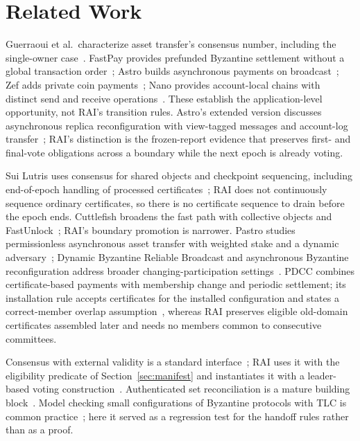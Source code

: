 \section{Related Work}
\label{sec:related}
Guerraoui et al.\ characterize asset transfer's consensus number, including the single-owner case~\cite{consensusnumber}. FastPay provides prefunded Byzantine settlement without a global transaction order~\cite{fastpay}; Astro builds asynchronous payments on broadcast~\cite{astro}; Zef adds private coin payments~\cite{zef}; Nano provides account-local chains with distinct send and receive operations~\cite{nano}. These establish the application-level opportunity, not RAI's transition rules. Astro's extended version discusses asynchronous replica reconfiguration with view-tagged messages and account-log transfer~\cite{astro,dbrb}; RAI's distinction is the frozen-report evidence that preserves first- and final-vote obligations across a boundary while the next epoch is already voting.

Sui Lutris uses consensus for shared objects and checkpoint sequencing, including end-of-epoch handling of processed certificates~\cite{lutris}; RAI does not continuously sequence ordinary certificates, so there is no certificate sequence to drain before the epoch ends. Cuttlefish broadens the fast path with collective objects and FastUnlock~\cite{cuttlefish}; RAI's boundary promotion is narrower. Pastro studies permissionless asynchronous asset transfer with weighted stake and a dynamic adversary~\cite{pastro}; Dynamic Byzantine Reliable Broadcast and asynchronous Byzantine reconfiguration address broader changing-participation settings~\cite{dbrb,reconfiguration}. PDCC combines certificate-based payments with membership change and periodic settlement; its installation rule accepts certificates for the installed configuration and states a correct-member overlap assumption~\cite{pdcc}, whereas RAI preserves eligible old-domain certificates assembled later and needs no members common to consecutive committees.

Consensus with external validity is a standard interface~\cite{externalvalidity}; RAI uses it with the eligibility predicate of Section~\ref{sec:manifest} and instantiates it with a leader-based voting construction~\cite{simplex,kudzu}. Authenticated set reconciliation is a mature building block~\cite{iblt,whatsthedifference,rateless}. Model checking small configurations of Byzantine protocols with TLC is common practice~\cite{tla}; here it served as a regression test for the handoff rules rather than as a proof.
